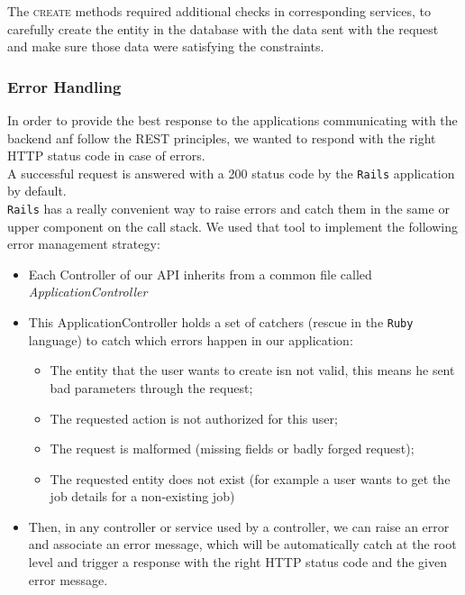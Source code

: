 \documentclass{eplmastersthesis}
\begin{document}
          The \textsc{create} methods required additional checks in corresponding
          services, to carefully create the entity in the database with
          the data sent with the request and make sure those data were
          satisfying the constraints.\\

        \subsubsection{Error Handling}

          In order to provide the best response to the applications
          communicating with the backend anf follow the REST
          principles, we wanted to respond with the right HTTP status code in
          case of errors.\\

          A successful request is answered with a 200
          status code by the \texttt{Rails} application by default.\\
          \texttt{Rails} has a really convenient way to raise errors and catch them
          in the same or upper component on the call stack. We used that tool
          to implement the following error management strategy:

          \begin{itemize}
            \item Each Controller of our API inherits from a common file
            called \textit{ApplicationController}
            \item This ApplicationController holds a set of catchers (rescue
            in the \texttt{Ruby} language) to catch which errors happen in our
            application:
              \begin{itemize}
                \item The entity that the user wants to create isn not valid,
                this means he sent bad parameters through the request;
                \item The requested action is not authorized for this user;
                \item The request is malformed (missing fields or badly forged
                request);
                \item The requested entity does not exist (for example a user
                wants to get the job details for a non-existing job)
              \end{itemize}
            \item Then, in any controller or service used by a controller, we
            can raise an error and associate an error message, which will be
            automatically catch at the root level and trigger a response with
            the right HTTP status code and the given error message.
          \end{itemize}
\end{document}
